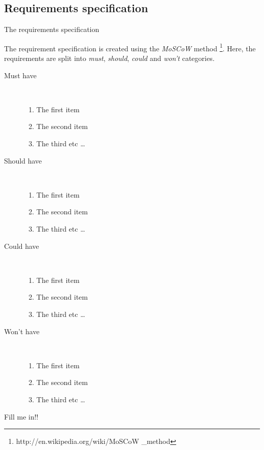 \newpage
\subsection{Requirements specification}
The requirements specification 

The requirement specification is created using the \textit{MoSCoW} method
\footnote{http://en.wikipedia.org/wiki/MoSCoW \_method}. Here, the requirements 
are split into \textit{must}, \textit{should}, \textit{could} and 
\textit{won't} categories.

\begin{description}
	\item[Must have] \hfill \\
	\begin{enumerate}
		\item The first item
		\item The second item
		\item The third etc \ldots
	\end{enumerate}
	\item[Should have] \hfill \\
	\begin{enumerate}
		\item The first item
		\item The second item
		\item The third etc \ldots
	\end{enumerate}
	\item[Could have] \hfill \\
	\begin{enumerate}
		\item The first item
		\item The second item
		\item The third etc \ldots
	\end{enumerate}
	\item[Won't have] \hfill \\
	\begin{enumerate}
		\item The first item
		\item The second item
		\item The third etc \ldots
	\end{enumerate}
\end{description}

Fill me in!!

